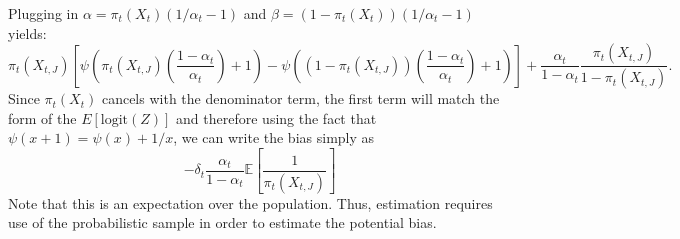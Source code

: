 \documentclass[12pt]{amsart}
\numberwithin{equation}{section}
\theoremstyle{plain}
\def\logit{\text{logit}}
\def\EE{\mathbb{E}}
\begin{document}
Plugging in $\alpha = \pi_t (X_t) (1/\alpha_t -1)$ and $\beta = (1-\pi_t (X_t))(1/\alpha_t - 1)$ yields:
$$
\pi_t (X_{t,J}) \left[ \psi \left(\pi_t (X_{t,J}) \left(\frac{1-\alpha_t}{\alpha_t}\right) + 1\right) - \psi \left((1-\pi_t (X_{t,J})) \left(\frac{1-\alpha_t}{\alpha_t}\right)+1\right) \right] + \frac{\alpha_t}{1-\alpha_t}\frac{\pi_t(X_{t,J})}{1-\pi_t(X_{t,J})}.
$$
Since $\pi_t(X_t)$ cancels with the denominator term, the first term will match the form of the $E[ \logit (Z)]$ and therefore using the fact that $\psi(x+1) = \psi(x) + 1/x$, we can write the bias simply as
$$
-\delta_t \frac{\alpha_t}{1-\alpha_t} \EE \left[ \frac{1}{\pi_t(X_{t,J})} \right]
$$
Note that this is an expectation over the population.  Thus, estimation requires use of the probabilistic sample in order to estimate the potential bias.


\end{document}

